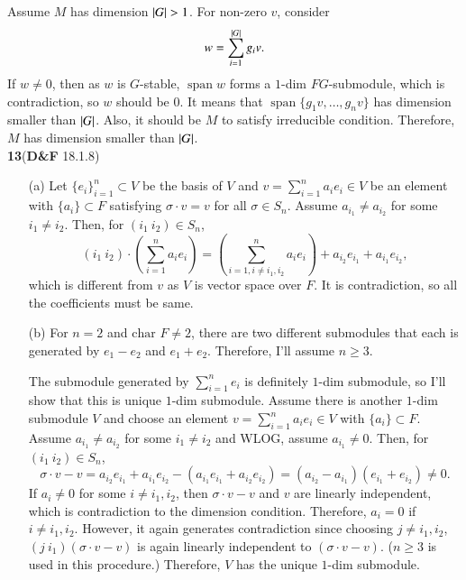 \documentclass[a4paper, 12pt]{article}
\theoremstyle{Mydefinition}
\theoremstyle{Mytheorem}
\DeclareMathOperator{\spn}{span}
\begin{document}
Assume $M$ has dimension $\abs{G}>1$. For non-zero $v$, consider
\begin{equation}
    w = \sum_{i=1}^{\abs{G}} g_i v.
\end{equation}
If $w\neq 0$, then as $w$ is $G$-stable, $\spn w$ forms a $1$-dim $FG$-submodule, which is contradiction, so $w$ should be $0$. It means that $\spn \{g_1v, \ldots, g_n v\}$ has dimension smaller than $\abs{G}$. Also, it should be $M$ to satisfy irreducible condition. Therefore, $M$ has dimension smaller than $\abs{G}$.\\

\noindent \textbf{13}(\textbf{D\&F} 18.1.8)
\begin{enumerate}
    \item[(a)] Let $\{e_i\}_{i=1}^n\subset V$ be the basis of $V$ and $v=\sum_{i=1}^n a_i e_i\in V$ be an element with $\{a_i\}\subset F$ satisfying $\sigma\cdot v =v$ for all $\sigma\in S_n$. Assume $a_{i_1}\neq a_{i_2}$ for some $i_1\neq i_2$. Then, for $(i_1~i_2)\in S_n$,
\begin{equation}
    (i_1~i_2)\cdot \left(\sum_{i=1}^n a_i e_i\right) = \left(\sum_{i=1, i\neq i_1,i_2}^n a_i e_i\right) + a_{i_2}e_{i_1}+a_{i_1}e_{i_2},
\end{equation}
which is different from $v$ as $V$ is vector space over $F$. It is contradiction, so all the coefficients must be same.
    \item[(b)] For $n=2$ and $\textrm{char } F\neq 2$, there are two different submodules that each is generated by $e_1-e_2$ and $e_1+e_2$. Therefore, I'll assume $n\geq 3$.
    
    The submodule generated by $\sum_{i=1}^n e_i$ is definitely $1$-dim submodule, so I'll show that this is unique $1$-dim submodule. Assume there is another $1$-dim submodule $V$ and choose an element $v = \sum_{i=1}^n a_i e_i\in V$ with $\{a_i\}\subset F$. Assume $a_{i_1}\neq a_{i_2}$ for some $i_1\neq i_2$ and WLOG, assume $a_{i_1} \neq 0$. Then, for $(i_1~i_2)\in S_n$,
    \begin{equation}
        \sigma \cdot v - v = a_{i_2}e_{i_1}+a_{i_1}e_{i_2} - \left(a_{i_1}e_{i_1}+a_{i_2}e_{i_2}\right) = (a_{i_2}-a_{i_1})(e_{i_1}+e_{i_2})\neq 0.
    \end{equation}
    If $a_i\neq 0$ for some $i\neq i_1,i_2$, then $\sigma \cdot v - v$ and $v$ are linearly independent, which is contradiction to the dimension condition. Therefore, $a_i=0$ if $i\neq i_1,i_2$. However, it again generates contradiction since choosing $j\neq i_1,i_2$, $(j~i_1)(\sigma \cdot v - v)$ is again linearly independent to $(\sigma\cdot v - v)$. ($n\geq 3$ is used in this procedure.) Therefore, $V$ has the unique $1$-dim submodule.
\end{enumerate}
\newpage
\end{document}
